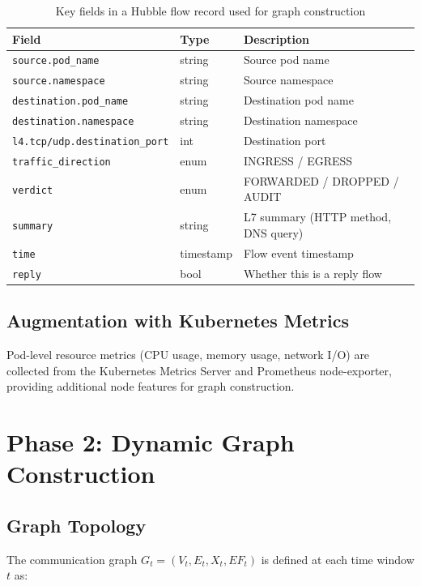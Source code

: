 \begin{table}[H]
\centering
\caption{Key fields in a Hubble flow record used for graph construction}
\label{tab:flow_schema}
\begin{tabularx}{\textwidth}{llX}
\toprule
\textbf{Field} & \textbf{Type} & \textbf{Description} \\
\midrule
\texttt{source.pod\_name} & string & Source pod name \\
\texttt{source.namespace} & string & Source namespace \\
\texttt{destination.pod\_name} & string & Destination pod name \\
\texttt{destination.namespace} & string & Destination namespace \\
\texttt{l4.tcp/udp.destination\_port} & int & Destination port \\
\texttt{traffic\_direction} & enum & INGRESS / EGRESS \\
\texttt{verdict} & enum & FORWARDED / DROPPED / AUDIT \\
\texttt{summary} & string & L7 summary (HTTP method, DNS query) \\
\texttt{time} & timestamp & Flow event timestamp \\
\texttt{reply} & bool & Whether this is a reply flow \\
\bottomrule
\end{tabularx}
\end{table}

\subsection{Augmentation with Kubernetes Metrics}

Pod-level resource metrics (CPU usage, memory usage, network I/O) are collected from the
Kubernetes Metrics Server and Prometheus node-exporter, providing additional node features
for graph construction.

\section{Phase 2: Dynamic Graph Construction}
\label{sec:design_phase2}

\subsection{Graph Topology}

The communication graph $G_t = (V_t, E_t, X_t, E\!F_t)$ is defined at each time window $t$ as:

